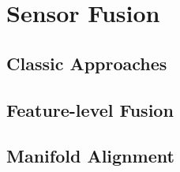 \section{Sensor Fusion}
	
	\subsection{Classic Approaches}
	
%		
%		
%		
		
	\subsection{Feature-level Fusion}
	
	\subsection{Manifold Alignment}
	
	
%	
%	
%	
%	
	

